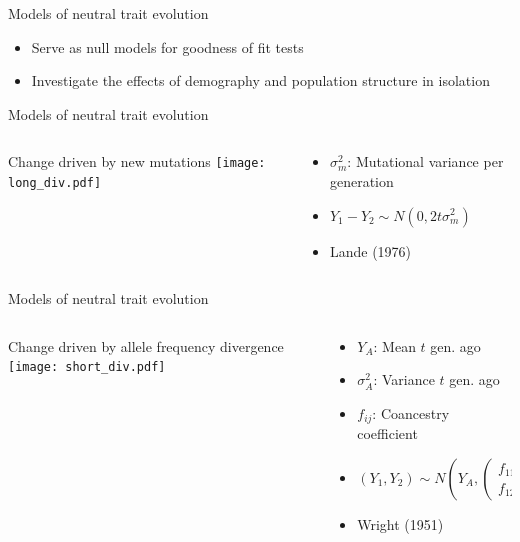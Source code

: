 \documentclass{beamer}
\begin{document}
\begin{frame}{Models of neutral trait evolution}
  \begin{itemize}
  \item Serve as null models for goodness of fit tests
  \item Investigate the effects of demography and population structure in
    isolation
  \end{itemize}
\end{frame}

\begin{frame}{Models of neutral trait evolution}
  \begin{columns}
    \begin{column}{0.48\columnwidth}
      \begin{block}{Change driven by new mutations}
        \texttt{[image: long\_div.pdf]}
      \end{block}
    \end{column}
    \begin{column}{0.48\columnwidth}
      \begin{itemize}
      \item $\sigma_m^2$: Mutational variance per generation
      \item {\footnotesize$Y_1 - Y_2 \sim N(0,2 t \sigma_m^2)$}
      \item  \footnotesize Lande (1976)
      \end{itemize}
    \end{column}
  \end{columns}  
\end{frame}

\begin{frame}{Models of neutral trait evolution}
  \begin{columns}
    \begin{column}{0.48\columnwidth}
      \begin{block}{Change driven by allele frequency divergence}
        \texttt{[image: short\_div.pdf]}
      \end{block}
    \end{column}
    \begin{column}{0.48\columnwidth}
      \begin{itemize}
        \item $Y_A$: Mean $t$ gen. ago
        \item $\sigma_A^2$: Variance $t$ gen. ago
        \item $f_{ij}$: Coancestry coefficient
        \item {\footnotesize$(Y_1,Y_2) \sim N(Y_A,
          \begin{pmatrix}
            f_{11} & f_{12}\\
            f_{12} & f_{22}
          \end{pmatrix}\sigma_A^2)$}
        \item \footnotesize Wright (1951)
        \end{itemize}
    \end{column}
  \end{columns}  
\end{frame}
\end{document}
